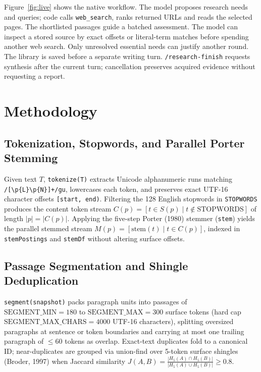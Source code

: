 \documentclass[conference]{IEEEtran}
\begin{document}
Figure~\ref{fig:live} shows the native workflow. The model proposes research needs and queries; code calls \texttt{web\_search}, ranks returned URLs and reads the selected pages. The shortlisted passages guide a batched assessment. The model can inspect a stored source by exact offsets or literal-term matches before spending another web search. Only unresolved essential needs can justify another round. The library is saved before a separate writing turn. \texttt{/research-finish} requests synthesis after the current turn; cancellation preserves acquired evidence without requesting a report.

\section{Methodology}

\subsection{Tokenization, Stopwords, and Parallel Porter Stemming}
Given text $T$, \texttt{tokenize(T)} extracts Unicode alphanumeric runs matching \texttt{/[\textbackslash p\{L\}\textbackslash p\{N\}]+/gu}, lowercases each token, and preserves exact UTF-16 character offsets \texttt{[start, end)}. Filtering the 128 English stopwords in \texttt{STOPWORDS} produces the content token stream $C(p) = [t \in S(p) \mid t \notin \text{STOPWORDS}]$ of length $|p| = |C(p)|$. Applying the five-step Porter (1980) stemmer (\texttt{stem}) yields the parallel stemmed stream $M(p) = [\text{stem}(t) \mid t \in C(p)]$, indexed in \texttt{stemPostings} and \texttt{stemDf} without altering surface offsets.

\subsection{Passage Segmentation and Shingle Deduplication}
\texttt{segment(snapshot)} packs paragraph units into passages of $\text{SEGMENT\_MIN} = 180$ to $\text{SEGMENT\_MAX} = 300$ surface tokens (hard cap $\text{SEGMENT\_MAX\_CHARS} = 4000$ UTF-16 characters), splitting oversized paragraphs at sentence or token boundaries and carrying at most one trailing paragraph of $\le 60$ tokens as overlap. Exact-text duplicates fold to a canonical ID; near-duplicates are grouped via union-find over 5-token surface shingles (Broder, 1997) when Jaccard similarity $J(A, B) = \frac{|H_5(A) \cap H_5(B)|}{|H_5(A) \cup H_5(B)|} \ge 0.8$.
\end{document}
